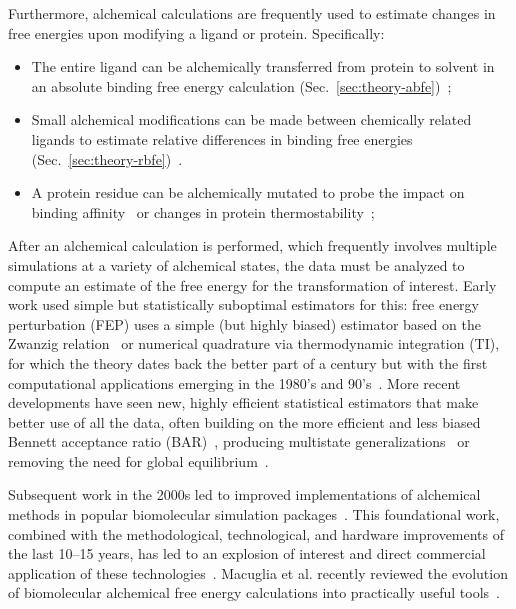 \documentclass[9pt,bestpractices]{livecoms}
\begin{document}
Furthermore, alchemical calculations are frequently used to estimate changes in free energies upon modifying a ligand or protein. Specifically:
\begin{itemize}
\item The entire ligand can be alchemically transferred from protein to solvent in an absolute binding free energy calculation (Sec.~\ref{sec:theory-abfe})~\cite{mobley2007predicting,aldeghi2015accurate,aldeghi2017predictions}; 
\item Small alchemical modifications can be made between chemically related ligands to estimate relative differences in binding free energies (Sec.~\ref{sec:theory-rbfe})~\cite{wang2015accurate,mey2016blinded,song2019using,gapsys2020large,kuhn2020assessment}.
\item A protein residue can be alchemically mutated to probe the impact on binding affinity~\cite{hauser2018predicting,aldeghi2018accurate} or changes in protein thermostability~\cite{seeliger2010protein,gapsys2016insights,gapsys2016accurate,aldeghi2019accurate}; 
\end{itemize}


After an alchemical calculation is performed, which frequently involves multiple simulations at a variety of alchemical states, the data must be analyzed to compute an estimate of the free energy for the transformation of interest.
Early work used simple but statistically suboptimal estimators for this: free energy perturbation (FEP) uses a simple (but highly biased) estimator based on the Zwanzig relation~\cite{zwanzig1954hightemperature} or numerical quadrature via thermodynamic integration (TI), for which the theory dates back the better part of a century but with the first computational applications emerging in the 1980's and 90's~\cite{kirkwood1935statistical, jorgensen1985monte, kollman1993free, wong1986dynamics, merz1989free}. %
More recent developments have seen new, highly efficient statistical estimators that make better use of all the data, often building on the more efficient and less biased Bennett acceptance ratio (BAR)~\cite{bennett1976efficient}, producing multistate generalizations~\cite{shirts2008statisticallya} or removing the need for global equilibrium~\cite{wu2016multiensemble, mey2014xtram, wu2014statistically}.

Subsequent work in the 2000s led to improved implementations of alchemical methods in popular biomolecular simulation packages~\cite{shirts2003extremely,shirts2005solvation,vanderspoel2005gromacs, mermelstein2018fast, wang2015accurate, hedges2019biosimspace, riniker2011calculation}. 
This foundational work, combined with the methodological, technological, and hardware improvements of the last 10--15 years, has led to an explosion of interest and direct commercial application of these technologies~\cite{wang2015accurate, fratev2019improved, schindler2020largescale, cournia2017relative, sherborne2016collaborating, kuhn2020assessment}. Macuglia et al. recently reviewed the evolution of biomolecular alchemical free energy calculations into practically useful tools~\cite{macuglia2025dawn}.
\end{document}
